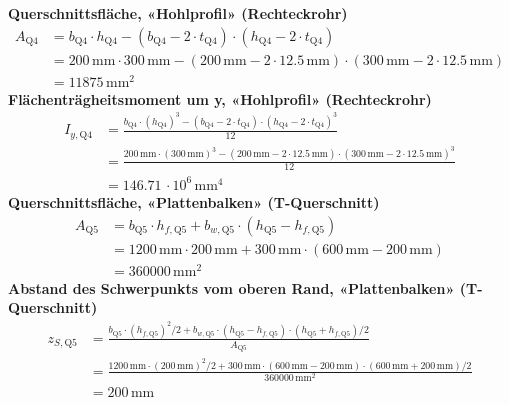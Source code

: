 \documentclass[11pt,a4paper]{article}
\begin{document}
\noindent\textbf{Querschnittsfläche, «Hohlprofil» (Rechteckrohr)}
\begin{equation*}
\begin{aligned}
  A_{\text{Q4}} &= b_{\text{Q4}} \cdot h_{\text{Q4}} - \left(b_{\text{Q4}} - 2 \cdot t_{\text{Q4}}\right) \cdot \left(h_{\text{Q4}} - 2 \cdot t_{\text{Q4}}\right) \\
  &= 200\,\mathrm{mm} \cdot 300\,\mathrm{mm} - \left(200\,\mathrm{mm} - 2 \cdot 12.5\,\mathrm{mm}\right) \cdot \left(300\,\mathrm{mm} - 2 \cdot 12.5\,\mathrm{mm}\right) \\
  &= 11875\,\mathrm{mm}^{2}
\end{aligned}
\end{equation*}
\noindent\textbf{Flächenträgheitsmoment um y, «Hohlprofil» (Rechteckrohr)}
\begin{equation*}
\begin{aligned}
  I_{y,\text{Q4}} &= \frac{b_{\text{Q4}} \cdot \left(h_{\text{Q4}}\right)^{3} - \left(b_{\text{Q4}} - 2 \cdot t_{\text{Q4}}\right) \cdot \left(h_{\text{Q4}} - 2 \cdot t_{\text{Q4}}\right)^{3}}{12} \\
  &= \frac{200\,\mathrm{mm} \cdot \left(300\,\mathrm{mm}\right)^{3} - \left(200\,\mathrm{mm} - 2 \cdot 12.5\,\mathrm{mm}\right) \cdot \left(300\,\mathrm{mm} - 2 \cdot 12.5\,\mathrm{mm}\right)^{3}}{12} \\
  &= 146.71\,\cdot 10^{6}\,\mathrm{mm}^{4}
\end{aligned}
\end{equation*}
\noindent\textbf{Querschnittsfläche, «Plattenbalken» (T-Querschnitt)}
\begin{equation*}
\begin{aligned}
  A_{\text{Q5}} &= b_{\text{Q5}} \cdot h_{f,\text{Q5}} + b_{w,\text{Q5}} \cdot \left(h_{\text{Q5}} - h_{f,\text{Q5}}\right) \\
  &= 1200\,\mathrm{mm} \cdot 200\,\mathrm{mm} + 300\,\mathrm{mm} \cdot \left(600\,\mathrm{mm} - 200\,\mathrm{mm}\right) \\
  &= 360000\,\mathrm{mm}^{2}
\end{aligned}
\end{equation*}
\noindent\textbf{Abstand des Schwerpunkts vom oberen Rand, «Plattenbalken» (T-Querschnitt)}
\begin{equation*}
\begin{aligned}
  z_{S,\text{Q5}} &= \frac{b_{\text{Q5}} \cdot \left(h_{f,\text{Q5}}\right)^{2} / 2 + b_{w,\text{Q5}} \cdot \left(h_{\text{Q5}} - h_{f,\text{Q5}}\right) \cdot \left(h_{\text{Q5}} + h_{f,\text{Q5}}\right) / 2}{A_{\text{Q5}}} \\
  &= \frac{1200\,\mathrm{mm} \cdot \left(200\,\mathrm{mm}\right)^{2} / 2 + 300\,\mathrm{mm} \cdot \left(600\,\mathrm{mm} - 200\,\mathrm{mm}\right) \cdot \left(600\,\mathrm{mm} + 200\,\mathrm{mm}\right) / 2}{360000\,\mathrm{mm}^{2}} \\
  &= 200\,\mathrm{mm}
\end{aligned}
\end{equation*}
\end{document}
